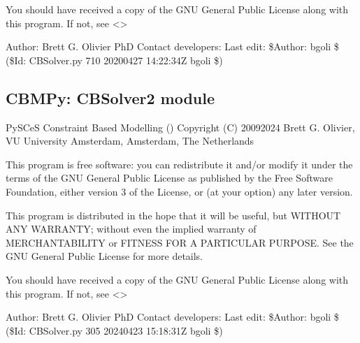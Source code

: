 \documentclass[letterpaper,12pt,english]{sphinxmanual}
\begin{document}
\sphinxAtStartPar
You should have received a copy of the GNU General Public License
along with this program.  If not, see \textless{}\textgreater{}

\sphinxAtStartPar
Author: Brett G. Olivier PhD
Contact developers: 
Last edit: \$Author: bgoli \$ (\$Id: CBSolver.py 710 2020\sphinxhyphen{}04\sphinxhyphen{}27 14:22:34Z bgoli \$)

\subsection{CBMPy: CBSolver2 module}
\label{\detokenize{api/solvers:cbmpy-cbsolver2-module}}\label{\detokenize{api/solvers:module-cbmpy.CBSolverX}}
\sphinxAtStartPar
PySCeS Constraint Based Modelling ()
Copyright (C) 2009\sphinxhyphen{}2024 Brett G. Olivier, VU University Amsterdam, Amsterdam, The Netherlands

\sphinxAtStartPar
This program is free software: you can redistribute it and/or modify
it under the terms of the GNU General Public License as published by
the Free Software Foundation, either version 3 of the License, or
(at your option) any later version.

\sphinxAtStartPar
This program is distributed in the hope that it will be useful,
but WITHOUT ANY WARRANTY; without even the implied warranty of
MERCHANTABILITY or FITNESS FOR A PARTICULAR PURPOSE.  See the
GNU General Public License for more details.

\sphinxAtStartPar
You should have received a copy of the GNU General Public License
along with this program.  If not, see \textless{}\textgreater{}

\sphinxAtStartPar
Author: Brett G. Olivier PhD
Contact developers: 
Last edit: \$Author: bgoli \$ (\$Id: CBSolver.py 305 2024\sphinxhyphen{}04\sphinxhyphen{}23 15:18:31Z bgoli \$)
\end{document}

